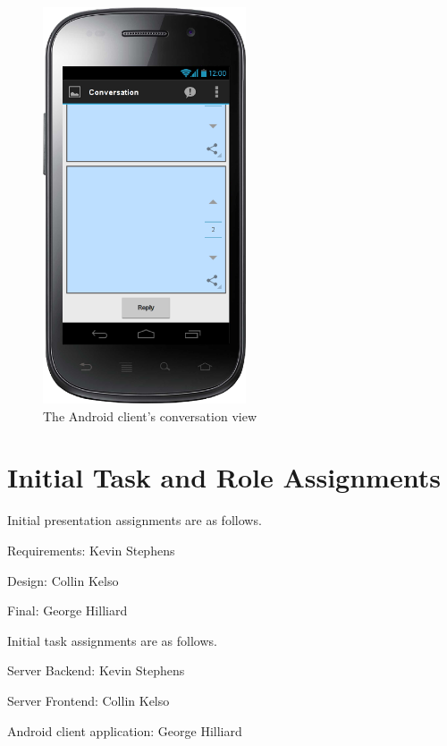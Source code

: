 \documentclass[11pt]{scrartcl}
\let\stdsection\section
\renewcommand\section{\newpage\stdsection}
\begin{document}
        \begin{figure}[h]
            \centering \includegraphics[width=6cm,keepaspectratio]{mockups/conversation-view}
            \caption{The Android client's conversation view}
            \label{fig:conversationscreen}
        \end{figure}

\clearpage
\section{Initial Task and Role Assignments}
    Initial presentation assignments are as follows.

    \begin{description*}
        \item[Requirements:] Kevin Stephens
        \item[Design:] Collin Kelso
        \item[Final:] George Hilliard
    \end{description*}

    \noindent
    Initial task assignments are as follows.

    \begin{description*}
        \item[Server Backend:] Kevin Stephens
        \item[Server Frontend:] Collin Kelso
        \item[Android client application:] George Hilliard
    \end{description*}
\end{document}
